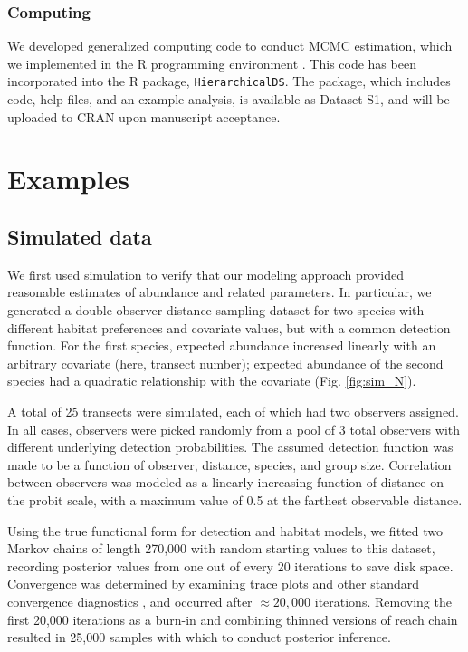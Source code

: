 \documentclass[10pt]{article}
\begin{document}
\subsubsection*{Computing}

We developed generalized computing code to conduct MCMC estimation, which we implemented in the R programming environment \cite{RTeam2007}.  This code has been incorporated into the R package, {\tt HierarchicalDS}.  The package, which includes code, help files, and an example analysis, is available as Dataset S1, and will be uploaded to CRAN upon manuscript acceptance.


\section*{Examples}

\subsection*{Simulated data}

We first used simulation to verify that our modeling approach provided reasonable estimates of abundance and related parameters.  In particular, we generated a double-observer distance sampling dataset for two species with different habitat preferences and covariate values, but with a common detection function.  For the first species, expected abundance increased linearly with an arbitrary covariate (here, transect number); expected abundance of the second species had a quadratic relationship with the covariate (Fig. \ref{fig:sim_N}).

A total of 25 transects were simulated, each of which had two observers assigned.
In all cases, observers were picked randomly from a pool of 3 total observers with different underlying detection probabilities.  The assumed detection function was made to be a function of observer, distance, species, and group size.  Correlation between observers was modeled as a linearly increasing function of distance on the probit scale, with a maximum value of 0.5 at the farthest observable distance.

Using the true functional form for detection and habitat models, we fitted two Markov chains of length 270,000 with random starting values to this dataset, recording posterior values from one out of every 20 iterations to save disk space.  Convergence was determined by examining trace plots and other standard convergence diagnostics \cite{GelmanEtAl2004}, and occurred after $\approx 20,000$ iterations. Removing the first 20,000 iterations as a burn-in and combining thinned versions of reach chain resulted in 25,000 samples with which to conduct posterior inference.
\end{document}
